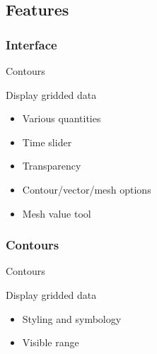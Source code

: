 \subsection{Features}

\subsubsection{Interface}
\begin{frame}{Contours}
	\begin{block}{Display gridded data}
		\begin{itemize}
			\item Various quantities
			\item Time slider
			\item Transparency
			\item Contour/vector/mesh options
			\item Mesh value tool
			
		\end{itemize}
		
	\end{block}
	
	
\end{frame}

\subsubsection{Contours}

\begin{frame}{Contours}
	\begin{block}{Display gridded data}
		\begin{itemize}
			\item Styling and symbology
			\item Visible range
		\end{itemize}
		
	\end{block}


\end{frame}